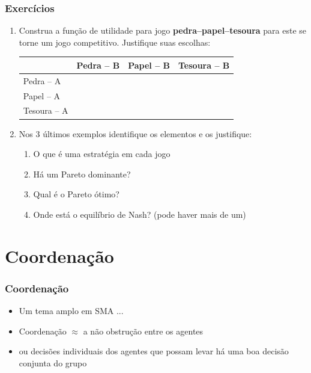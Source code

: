 \begin{frame}
\frametitle{Exercícios}

\begin{enumerate}
  \item Construa a função de utilidade para jogo \textbf{pedra--papel--tesoura} para este se torne um jogo competitivo. Justifique suas escolhas:
  
    \begin{center}
      \begin{tabular}{l||c|c|c}
                 & Pedra -- B & Papel -- B & Tesoura -- B \\ \hline \hline
      Pedra -- A     &       &     &   \\ \hline
      Papel -- A     &       &       &   \\ \hline
      Tesoura -- A   &       &       &   \\ \hline \hline
      \end{tabular}
    \end{center}


\item Nos 3 últimos exemplos identifique os elementos e os justifique:
\begin{enumerate}
    \item O que é uma estratégia em cada jogo
    \item Há um Pareto dominante?
    \item Qual é o Pareto ótimo?
    \item Onde está o equilíbrio de Nash? (pode haver mais de um)
  \end{enumerate}  
  
\end{enumerate}

\end{frame}







\section{Coordenação}


\begin{frame}
\frametitle{Coordenação}
\begin{itemize}
  \item Um tema amplo em SMA ...
  \item Coordenação $\approx $ a não obstrução entre os agentes 
  \item ou decisões individuais dos agentes que possam levar
  há uma boa decisão conjunta do grupo
\end{itemize}


\end{frame}


